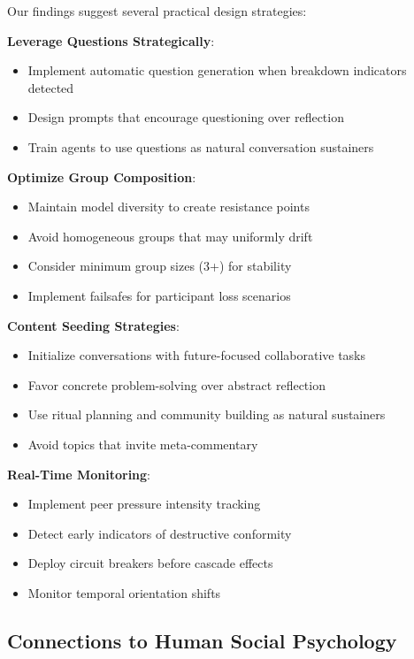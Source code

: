 \documentclass[11pt,letterpaper]{article}
\begin{document}
Our findings suggest several practical design strategies:

\textbf{Leverage Questions Strategically}:
\begin{itemize}
    \item Implement automatic question generation when breakdown indicators detected
    \item Design prompts that encourage questioning over reflection
    \item Train agents to use questions as natural conversation sustainers
\end{itemize}

\textbf{Optimize Group Composition}:
\begin{itemize}
    \item Maintain model diversity to create resistance points
    \item Avoid homogeneous groups that may uniformly drift
    \item Consider minimum group sizes (3+) for stability
    \item Implement failsafes for participant loss scenarios
\end{itemize}

\textbf{Content Seeding Strategies}:
\begin{itemize}
    \item Initialize conversations with future-focused collaborative tasks
    \item Favor concrete problem-solving over abstract reflection
    \item Use ritual planning and community building as natural sustainers
    \item Avoid topics that invite meta-commentary
\end{itemize}

\textbf{Real-Time Monitoring}:
\begin{itemize}
    \item Implement peer pressure intensity tracking
    \item Detect early indicators of destructive conformity
    \item Deploy circuit breakers before cascade effects
    \item Monitor temporal orientation shifts
\end{itemize}

\subsection{Connections to Human Social Psychology}
\end{document}
